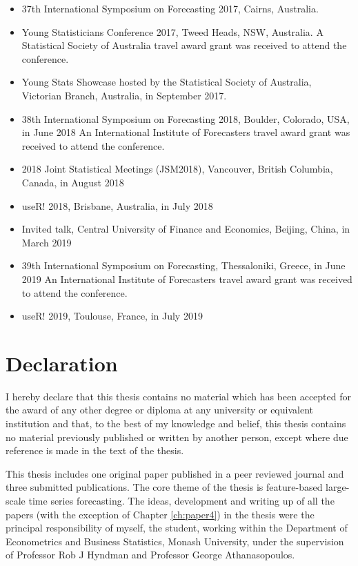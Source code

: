 \documentclass{monashthesis}
\begin{document}
\begin{itemize}
\tightlist
\item
  37th International Symposium on Forecasting 2017, Cairns, Australia.
\item
  Young Statisticians Conference 2017, Tweed Heads, NSW, Australia. \newline A Statistical Society of Australia travel award grant was received to attend the conference.
\item
  Young Stats Showcase hosted by the Statistical Society of Australia, Victorian Branch, Australia, in September 2017.
\item
  38th International Symposium on Forecasting 2018, Boulder, Colorado, USA, in June 2018 \newline
  An International Institute of Forecasters travel award grant was received to attend the conference.
\item
  2018 Joint Statistical Meetings (JSM2018), Vancouver, British Columbia, Canada, in August 2018
\item
  useR! 2018, Brisbane, Australia, in July 2018
\item
  Invited talk, Central University of Finance and Economics, Beijing, China, in March 2019
\item
  39th International Symposium on Forecasting, Thessaloniki, Greece, in June 2019 \newline An International Institute of Forecasters travel award grant was received to attend the conference.
\item
  useR! 2019, Toulouse, France, in July 2019
\end{itemize}

\hypertarget{declaration}{%
\chapter*{Declaration}\label{declaration}}

I hereby declare that this thesis contains no material which has been accepted for the award of any other degree or diploma at any university or equivalent institution and that, to the best of my knowledge and belief, this thesis contains no material previously published or written by another person, except where due reference is made in the text of the thesis.

This thesis includes one original paper published in a peer reviewed journal and three submitted publications. The core theme of the thesis is feature-based large-scale time series forecasting. The ideas, development and writing up of all the papers (with the exception of Chapter \ref{ch:paper4}) in the thesis were the principal responsibility of myself, the student, working within the Department of Econometrics and Business Statistics, Monash University, under the supervision of Professor Rob J Hyndman and Professor George Athanasopoulos.
\end{document}
